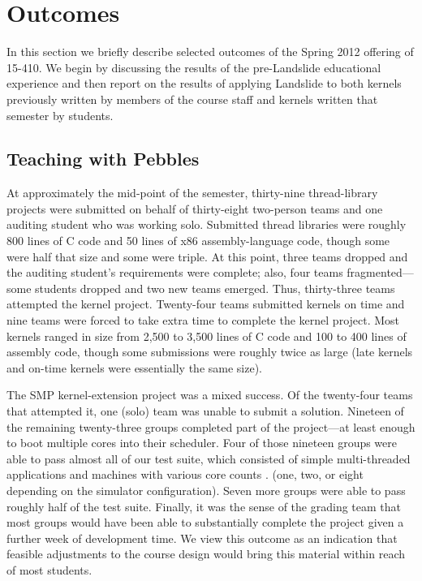 \section{Outcomes}

In this section we briefly describe selected
outcomes of the Spring 2012 offering of 15-410.
We begin by discussing the results of the
pre-Landslide educational experience and then
report on the results of applying Landslide to
both kernels previously written by members of the course staff
and kernels written that semester by students.

\subsection{Teaching with Pebbles}

At approximately the mid-point of the semester,
thirty-nine thread-library projects were submitted
on behalf of thirty-eight two-person teams and one
auditing student who was working solo.
%
Submitted thread libraries were roughly 800 lines of C code
and 50 lines of x86 assembly-language code,
though some were half that size and some were triple.
%
At this point, three teams dropped and the auditing
student's requirements were complete;
also, four teams fragmented---some students dropped and
two new teams emerged.
Thus, thirty-three teams attempted the kernel project.
%
Twenty-four teams submitted kernels on time and nine
teams were forced to take extra time to complete the
kernel project.
Most kernels ranged in size from 2,500 to 3,500 lines
of C code and 100 to 400 lines of assembly code,
though some submissions were roughly twice as large
(late kernels and on-time kernels were essentially the
same size).


The SMP kernel-extension project
was a mixed success.
Of the twenty-four teams that attempted it,
one (solo) team was unable to submit a solution.
Nineteen of the remaining twenty-three groups
completed part of the project---at least enough to
boot multiple cores
into their scheduler.
Four of those nineteen groups were able to pass
almost all of our test suite,
which consisted of simple multi-threaded applications
and machines with various core counts\shortversion
{.}
{(one, two, or eight depending on the simulator configuration).}
Seven more groups were able to pass roughly half of the test suite.
Finally, it was the sense of the grading team that
most groups would have been able to substantially complete
the project given a further week of development time.
We view this outcome as an indication that feasible adjustments
to the course design would bring this material within reach
of most students.

